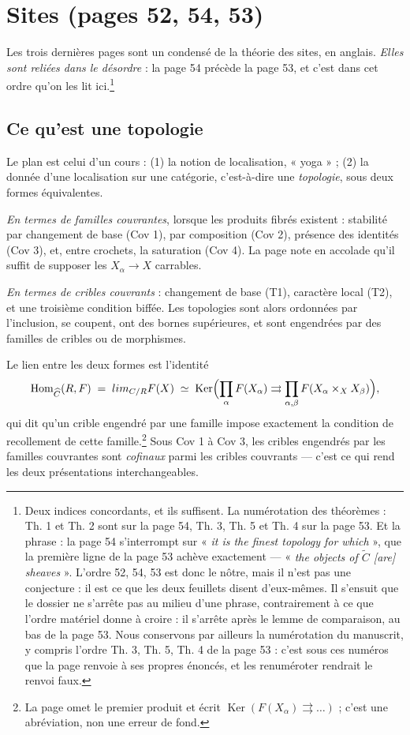 \documentclass[11pt,a4paper]{article}
\begin{document}
\section*{Sites (pages 52, 54, 53)}

Les trois dernières pages sont un condensé de la théorie des sites, en anglais.
\emph{Elles sont reliées dans le désordre} : la page 54 précède la page 53, et
c'est dans cet ordre qu'on les lit ici.\footnote{Deux indices concordants, et
ils suffisent. La numérotation des théorèmes : Th. 1 et Th. 2 sont sur la
page 54, Th. 3, Th. 5 et Th. 4 sur la page 53. Et la phrase : la page 54
s'interrompt sur « \emph{it is the finest topology for which} », que la
première ligne de la page 53 achève exactement — « \emph{the objects of
$\widetilde{C}$ [are] sheaves} ». L'ordre 52, 54, 53 est donc le nôtre, mais il
n'est pas une conjecture : il est ce que les deux feuillets disent d'eux-mêmes.
Il s'ensuit que le dossier ne s'arrête pas au milieu d'une phrase, contrairement
à ce que l'ordre matériel donne à croire : il s'arrête après le lemme de
comparaison, au bas de la page 53. Nous conservons par ailleurs la numérotation
du manuscrit, y compris l'ordre Th. 3, Th. 5, Th. 4 de la page 53 : c'est sous
ces numéros que la page renvoie à ses propres énoncés, et les renuméroter
rendrait le renvoi faux.}

\subsection*{Ce qu'est une topologie}

Le plan est celui d'un cours : (1) la notion de localisation, « yoga » ; (2) la
donnée d'une localisation sur une catégorie, c'est-à-dire une
\emph{topologie}, sous deux formes équivalentes.

\emph{En termes de familles couvrantes}, lorsque les produits fibrés existent :
stabilité par changement de base (Cov 1), par composition (Cov 2), présence des
identités (Cov 3), et, entre crochets, la saturation (Cov 4). La page note en
accolade qu'il suffit de supposer les $X_{\alpha} \to X$ carrables.

\emph{En termes de cribles couvrants} : changement de base (T1), caractère
local (T2), et une troisième condition biffée. Les topologies sont alors
ordonnées par l'inclusion, se coupent, ont des bornes supérieures, et sont
engendrées par des familles de cribles ou de morphismes.

Le lien entre les deux formes est l'identité
\[
\operatorname{Hom}_{\widehat{C}}(R, F) \;=\; \varprojlim_{C/R} F(X)
\;\simeq\; \operatorname{Ker}\Bigl( \prod_{\alpha} F(X_{\alpha})
\rightrightarrows \prod_{\alpha,\beta} F(X_{\alpha} \times_{X} X_{\beta})
\Bigr),
\]
qui dit qu'un crible engendré par une famille impose exactement la condition de
recollement de cette famille.\footnote{La page omet le premier produit et écrit
$\operatorname{Ker}(F(X_{\alpha}) \rightrightarrows \ldots)$ ; c'est une
abréviation, non une erreur de fond.} Sous Cov 1 à Cov 3, les cribles engendrés
par les familles couvrantes sont \emph{cofinaux} parmi les cribles couvrants —
c'est ce qui rend les deux présentations interchangeables.
\end{document}
